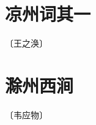\documentclass[12pt,UTF-8,openany]{ctexbook}
\begin{document}
\vspace{8pt}


\section{凉州词其一}

\begin{center}
    \vspace{10pt}
    
    \begin{normalsize}
        
        〔王之涣〕
        
    \end{normalsize}
    
    \vspace{8pt}
    
    \begin{large}
        
        
        
    \end{large}
    
\end{center}

\vspace{8pt}


\section{滁州西涧}

\begin{center}
    \vspace{10pt}
    
    \begin{normalsize}
        
        〔韦应物〕
        
    \end{normalsize}
    
    \vspace{8pt}
    
    \begin{large}
        
        
        
    \end{large}
    
\end{center}
\end{document}
